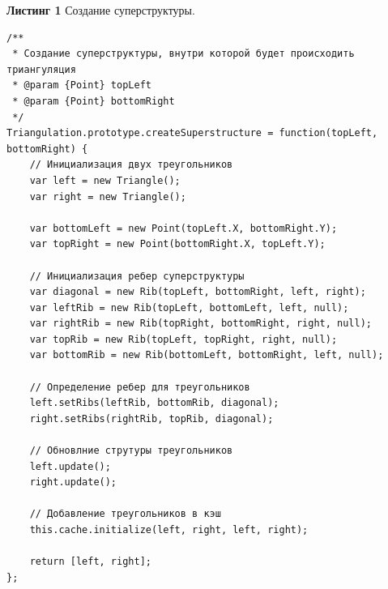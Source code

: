 \documentclass[a4paper, 12pt]{article}   	%
\begin{document}
\textbf{Листинг 1} Создание суперструктуры.
\begin{verbatim}
/**
 * Создание суперструктуры, внутри которой будет происходить триангуляция
 * @param {Point} topLeft
 * @param {Point} bottomRight
 */
Triangulation.prototype.createSuperstructure = function(topLeft, bottomRight) {
    // Инициализация двух треугольников
    var left = new Triangle();
    var right = new Triangle();

    var bottomLeft = new Point(topLeft.X, bottomRight.Y);
    var topRight = new Point(bottomRight.X, topLeft.Y);

    // Инициализация ребер суперструктуры
    var diagonal = new Rib(topLeft, bottomRight, left, right);
    var leftRib = new Rib(topLeft, bottomLeft, left, null);
    var rightRib = new Rib(topRight, bottomRight, right, null);
    var topRib = new Rib(topLeft, topRight, right, null);
    var bottomRib = new Rib(bottomLeft, bottomRight, left, null);

    // Определение ребер для треугольников
    left.setRibs(leftRib, bottomRib, diagonal);
    right.setRibs(rightRib, topRib, diagonal);

    // Обновлние струтуры треугольников
    left.update();
    right.update();

    // Добавление треугольников в кэш
    this.cache.initialize(left, right, left, right);

    return [left, right];
};
\end{verbatim}
\end{document}
